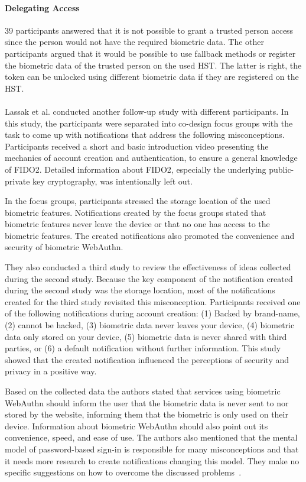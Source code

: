 \documentclass[runningheads]{llncs}
\begin{document}
\paragraph{Delegating Access}
39 participants answered that it is not possible to grant a trusted person access since the person would not have the required biometric data. The other participants argued that it would be possible to use fallback methods or register the biometric data of the trusted person on the used HST. The latter is right, the token can be unlocked using different biometric data if they are registered on the HST.

\paragraph{}
Lassak et al. conducted another follow-up study with different participants. In this study, the participants were separated into co-design focus groups with the task to come up with notifications that address the following misconceptions. Participants received a short and basic introduction video presenting the mechanics of account creation and authentication, to ensure a general knowledge of FIDO2. Detailed information about FIDO2, especially the underlying public-private key cryptography, was intentionally left out.

In the focus groups, participants stressed the storage location of the used biometric features. Notifications created by the focus groups stated that biometric features never leave the device or that no one has access to the biometric features. The created notifications also promoted the convenience and security of biometric WebAuthn.

They also conducted a third study to review the effectiveness of ideas collected during the second study. Because the key component of the notification created during the second study was the storage location, most of the notifications created for the third study revisited this misconception. Participants received one of the following notifications during account creation: (1) Backed by brand-name, (2) cannot be hacked, (3) biometric data never leaves your device, (4) biometric data only stored on your device, (5) biometric data is never shared with third parties, or (6) a default notification without further information. This study showed that the created notification influenced the perceptions of security and privacy in a positive way.

Based on the collected data the authors stated that services using biometric WebAuthn should inform the user that the biometric data is never sent to nor stored by the website, informing them that the biometric is only used on their device. Information about biometric WebAuthn should also point out its convenience, speed, and ease of use. The authors also mentioned that the mental model of password-based sign-in is responsible for many misconceptions and that it needs more research to create notifications changing this model. They make no specific suggestions on how to overcome the discussed problems~\cite{274547}.
\end{document}
